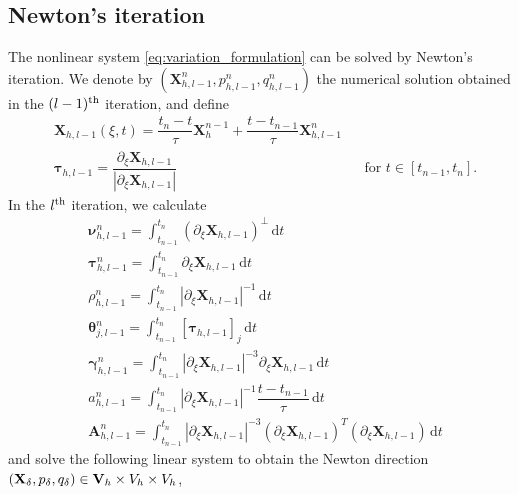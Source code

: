 \documentclass[review]{elsarticle}
\begin{document}
\subsection{Newton's iteration}
The nonlinear system \eqref{eq:variation_formulation} can be solved by Newton's iteration. We denote by $(\mathbf{X}_{h,l-1}^n, p_{h,l-1}^n, q_{h,l-1}^n) $ the numerical solution obtained in the $(l-1)^{\rm th}$ iteration, and define
\begin{align}
& \mathbf{X}_{h,l-1}(\xi, t) = \dfrac{t_{n} - t}{\tau}\mathbf{X}_h^{n - 1} + \dfrac{t - t_{n-1}}{\tau}\mathbf{X}_{h,l-1}^n \\
& \boldsymbol\tau_{h,l-1} = \dfrac{\partial_\xi\mathbf{X}_{h,l-1}}{|\partial_\xi\mathbf{X}_{h,l-1}|}
&&\mbox{for $t\in[t_{n-1}, t_{n}]$} .
\end{align}
In the $l^{\rm th}$ iteration, we calculate
\begin{align}
&\boldsymbol\nu_{h,l-1}^n = \int_{t_{n-1}}^{t_{n}} \left(\partial_\xi\mathbf{X}_{h,l-1}\right)^\perp\, \mathrm{d}t \label{eq:newton_nu_tau}\\
&\boldsymbol\tau_{h,l-1}^n = \int_{t_{n-1}}^{t_{n}}\partial_\xi\mathbf{X}_{h,l-1} \, \mathrm{d}t \\
&\rho_{h,l-1}^n = \int_{t_{n-1}}^{t_{n}}\left|\partial_\xi\mathbf{X}_{h,l-1}\right|^{-1}\,\mathrm{d}t \\
& \boldsymbol\theta_{j, l-1}^n = \int_{t_{n-1}}^{t_{n}}\left[\boldsymbol\tau_{h,l-1}\right]_j\,\mathrm{d}t \\
    &\boldsymbol\gamma_{h,l-1}^n = \int_{t_{n-1}}^{t_{n}}\left|\partial_\xi\mathbf{X}_{h,l-1}\right|^{-3}\partial_\xi\mathbf{X}_{h,l-1}\,\mathrm{d}t \\
&a_{h,l-1}^n = \int_{t_{n-1}}^{t_{n}}\left|\partial_\xi\mathbf{X}_{h,l-1}\right|^{-1}\dfrac{t - t_{n-1}}{\tau}\,\mathrm{d}t \\
    &\bm{A}_{h,l-1}^n = \int_{t_{n-1}}^{t_{n}} \left| \partial_\xi\mathbf{X}_{h,l-1}\right|^{-3} \left(\partial_\xi\mathbf{X}_{h,l-1}\right)^{T} \left(\partial_\xi\mathbf{X}_{h,l-1}\right)\,\mathrm{d}t \label{eq:newton_A}
\end{align}
and solve the following linear system to obtain the Newton direction $(\mathbf{X}_\delta, p_\delta, q_\delta)\in {\bf V}_h\times V_h\times V_h$,
\end{document}
